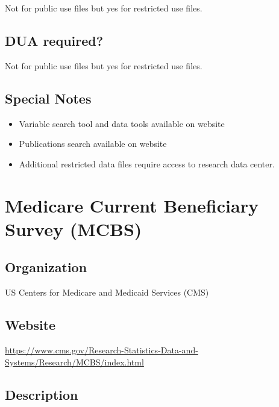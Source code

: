 \documentclass[
]{book}
\providecommand{\tightlist}{%
  \setlength{\itemsep}{0pt}\setlength{\parskip}{0pt}}
\begin{document}
Not for public use files but yes for restricted use files.

\hypertarget{dua-required-36}{%
\section{DUA required?}\label{dua-required-36}}

Not for public use files but yes for restricted use files.

\hypertarget{special-notes-36}{%
\section{Special Notes}\label{special-notes-36}}

\begin{itemize}
\tightlist
\item
  Variable search tool and data tools available on website
\item
  Publications search available on website
\item
  Additional restricted data files require access to research data center.
\end{itemize}

\mainmatter

\hypertarget{medicare-current-beneficiary-survey-mcbs}{%
\chapter{Medicare Current Beneficiary Survey (MCBS)}\label{medicare-current-beneficiary-survey-mcbs}}

\hypertarget{organization-37}{%
\section{Organization}\label{organization-37}}

US Centers for Medicare and Medicaid Services (CMS)

\hypertarget{website-37}{%
\section{Website}\label{website-37}}

\url{https://www.cms.gov/Research-Statistics-Data-and-Systems/Research/MCBS/index.html}

\hypertarget{description-37}{%
\section{Description}\label{description-37}}
\end{document}
